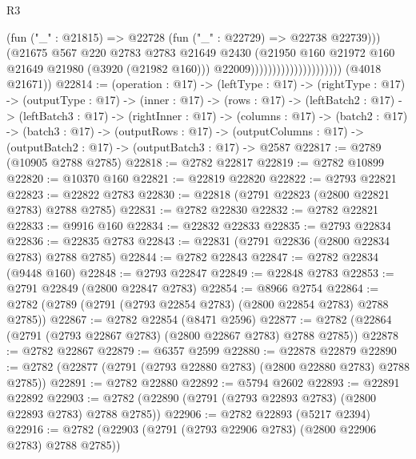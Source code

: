 \begin{lexlean}{R3}
\begin{coremodule}
                                                (fun ("_" : @21815) =>
                                                @22728 (fun ("_" : @22729) => @22738 @22739)))
                                              (@21675
                                                @567
                                                @220
                                                @2783
                                                @2783
                                                @21649
                                                @2430
                                                (@21950
                                                  @160
                                                  @21972
                                                  @160
                                                  @21649
                                                  @21980
                                                  (@3920 (@21982 @160)))
                                                @22009)))))))))))))))))))))
      (@4018 @21671))
@22814 := (operation : @17) ->
  (leftType : @17) ->
  (rightType : @17) ->
  (outputType : @17) ->
  (inner : @17) ->
  (rows : @17) ->
  (leftBatch2 : @17) ->
  (leftBatch3 : @17) ->
  (rightInner : @17) ->
  (columns : @17) ->
  (batch2 : @17) ->
  (batch3 : @17) ->
  (outputRows : @17) ->
  (outputColumns : @17) -> (outputBatch2 : @17) -> (outputBatch3 : @17) -> @2587
@22817 := @2789 (@10905 @2788 @2785)
@22818 := @2782 @22817
@22819 := @2782 @10899
@22820 := @10370 @160
@22821 := @22819 @22820
@22822 := @2793 @22821
@22823 := @22822 @2783
@22830 := @22818 (@2791 @22823 (@2800 @22821 @2783) @2788 @2785)
@22831 := @2782 @22830
@22832 := @2782 @22821
@22833 := @9916 @160
@22834 := @22832 @22833
@22835 := @2793 @22834
@22836 := @22835 @2783
@22843 := @22831 (@2791 @22836 (@2800 @22834 @2783) @2788 @2785)
@22844 := @2782 @22843
@22847 := @2782 @22834 (@9448 @160)
@22848 := @2793 @22847
@22849 := @22848 @2783
@22853 := @2791 @22849 (@2800 @22847 @2783)
@22854 := @8966 @2754
@22864 := @2782 (@2789 (@2791 (@2793 @22854 @2783) (@2800 @22854 @2783) @2788 @2785))
@22867 := @2782 @22854 (@8471 @2596)
@22877 := @2782 (@22864 (@2791 (@2793 @22867 @2783) (@2800 @22867 @2783) @2788 @2785))
@22878 := @2782 @22867
@22879 := @6357 @2599
@22880 := @22878 @22879
@22890 := @2782 (@22877 (@2791 (@2793 @22880 @2783) (@2800 @22880 @2783) @2788 @2785))
@22891 := @2782 @22880
@22892 := @5794 @2602
@22893 := @22891 @22892
@22903 := @2782 (@22890 (@2791 (@2793 @22893 @2783) (@2800 @22893 @2783) @2788 @2785))
@22906 := @2782 @22893 (@5217 @2394)
@22916 := @2782 (@22903 (@2791 (@2793 @22906 @2783) (@2800 @22906 @2783) @2788 @2785))

\end{coremodule}
\end{lexlean}
